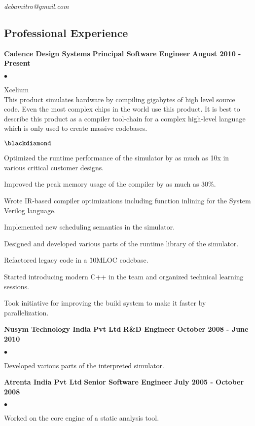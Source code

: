 \documentclass[margin,line]{res}
\newenvironment{list1}{
  \begin{list}{$\bullet$}{%
      \setlength{\itemsep}{0in}
      \setlength{\parsep}{0in} \setlength{\parskip}{0in}
      \setlength{\topsep}{0in} \setlength{\partopsep}{0in}
      \setlength{\leftmargin}{0.17in}}}{\end{list}}
\newenvironment{list2}{
  \begin{list}{$\blackdiamond$}{%
      \setlength{\itemsep}{0in}
      \setlength{\parsep}{0in} \setlength{\parskip}{0in}
      \setlength{\topsep}{0in} \setlength{\partopsep}{0in}
      \setlength{\leftmargin}{0.2in}}}{\end{list}}
\begin{document}
 \hfill {\em debamitro@gmail.com}

\begin{resume}

\section{\sc Professional Experience}
{\bf   Cadence Design Systems}
\hfill {\bf Principal Software Engineer}
\hfill{\bf August 2010 - Present}
\vspace{.05in}
\begin{list1} %
	\item Xcelium \\
	This product simulates hardware by compiling gigabytes of high level source code. Even the most complex chips in the world use this product. It is best to describe this product as a compiler tool-chain
for a complex high-level language which is only used to create massive codebases.
	\begin{list2}
		\item Optimized the runtime performance of the simulator by as much as 10x in various critical customer designs.
		\item Improved the peak memory usage of the compiler by as much as 30\%.
		\item Wrote IR-based compiler optimizations including function inlining for the System Verilog language.
		\item Implemented new scheduling semantics in the simulator.
		\item Designed and developed various parts of the runtime library of the simulator.
		\item Refactored legacy code in a \~10MLOC codebase.
   		\item Started introducing modern C++ in the team and organized technical learning sessions.
   		\item Took initiative for improving the build system to make it faster by parallelization.
	\end{list2}
\end{list1}

{\bf  Nusym Technology India Pvt Ltd}
\hfill {\bf R\&D Engineer}
\hfill{\bf October 2008 - June 2010}
\vspace{.05in}
\begin{list1} %
	\item Developed various parts of the interpreted simulator.
\end{list1}
{\bf  Atrenta India Pvt Ltd}
\hfill {\bf Senior Software Engineer}
\hfill{\bf July 2005 - October 2008}
\vspace{.05in}
\begin{list1} %
\item Worked on the core engine of a static analysis tool.
\end{list1}


\end{resume}
\end{document}
